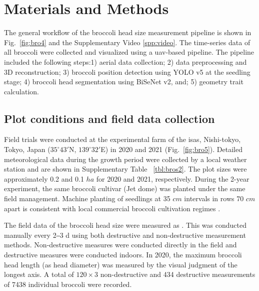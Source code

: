 \section{Materials and Methods}

The general workflow of the broccoli head size measurement pipeline is shown in Fig.~\ref{fig:bro4} and the Supplementary Video \ref{spp:video}. The time-series data of all broccoli were collected and visualized using a \gls{uav}-based pipeline. The pipeline included the following steps:1) aerial data collection; 2) data preprocessing and 3D reconstruction; 3) broccoli position detection using YOLO v5 at the seedling stage; 4) broccoli head segmentation using BiSeNet v2, and; 5) geometry trait calculation. 




\subsection{Plot conditions and field data collection}

Field trials were conducted at the experimental farm of the \gls{isas}, Nishi-tokyo, Tokyo, Japan ($35^\circ 43'$N, $139^\circ 32'$E) in 2020 and 2021 (Fig.~\ref{fig:bro5}). Detailed meteorological data during the growth period were collected by a local weather station and are shown in Supplementary Table ~\ref{tbl:bros2}. The plot sizes were approximately 0.2 and 0.1 $ha$ for 2020 and 2021, respectively. During the 2-year experiment, the same broccoli cultivar (Jet dome) was planted under the same field management. Machine planting of seedlings at 35 $cm$ intervals in rows 70 $cm$ apart is consistent with local commercial broccoli cultivation regimes . 



The field data of the broccoli head size were measured  as . This was conducted manually every 2‒3 d using both destructive and non-destructive measurement methods. Non-destructive measures were conducted directly in the field and destructive measures were conducted indoors. In 2020, the maximum broccoli head length (as head diameter) was measured by the visual judgment of the longest axis. A total of $120 \times 3$ non-destructive and 434 destructive measurements of 7438 individual broccoli were recorded. 


